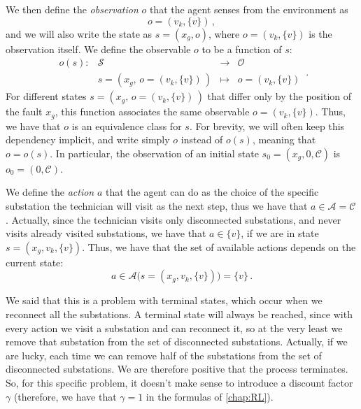 We then define the \emph{observation} $o$ that the agent senses from the environment as
\begin{equation}
    o = (v_k, \{v\}) \, ,
\end{equation}
and we will also write the state as $s=(x_g, o)$, where $o = (v_k, \{v\})$ is the observation itself. We define the observable $o$ to be a function of $s$:
\begin{equation}
    \begin{array}{cccc}
    o(s): & \mathcal S                                     & \rightarrow & \mathcal O       \\
          & s = (x_g, \, o = \left( v_k, \{v\} \right) \,) & \mapsto     & o = (v_k, \{v\})
\end{array} \, .
\end{equation}
For different states $s = (x_g, \, o = \left( v_k, \{v\} \right) \,)$ that differ only by the position of the fault $x_g$, this function associates the same observable $o = (v_k, \{v\})$. Thus, we have that $o$ is an equivalence class for $s$. For brevity, we will often keep this dependency implicit, and write simply $o$ instead of $o(s)$, meaning that $o = o(s)$. In particular, the observation of an initial state $s_0 = (x_g, 0, \mathcal C)$ is $o_0 = (0, \mathcal C)$.

We define the \emph{action} $a$ that the agent can do as the choice of the specific substation the technician will visit as the next step, thus we have that $a \in \mathcal A = \mathcal C$. Actually, since the technician visits only disconnected substations, and never visits already visited substations, we have that $a \in \{v\}$, if we are in state $s = (x_g, v_k, \{v\})$. Thus, we have that the set of available actions depends on the current state:
\begin{equation}
    a \in \mathcal A \big( s = (x_g, v_k, \{v\}) \big) = \{v\} \, .
\end{equation}

We said that this is a problem with terminal states, which occur when we reconnect all the substations. A terminal state will always be reached, since with every action we visit a substation and can reconnect it, so at the very least we remove that substation from the set of disconnected substations. Actually, if we are lucky, each time we can remove half of the substations from the set of disconnected substations. We are therefore positive that the process terminates. So, for this specific problem, it doesn't make sense to introduce a discount factor $\gamma$ (therefore, we have that $\gamma = 1$ in the formulas of \autoref{chap:RL}).

